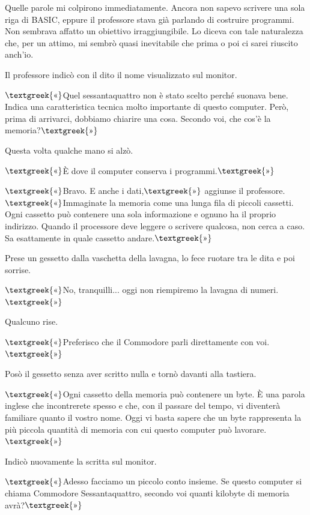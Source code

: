 \documentclass{article}
\begin{document}
Quelle parole mi colpirono immediatamente. Ancora non sapevo scrivere una sola riga di BASIC, eppure il professore stava
già parlando di costruire programmi. Non sembrava affatto un obiettivo irraggiungibile. Lo diceva con tale naturalezza
che, per un attimo, mi sembrò quasi inevitabile che prima o poi ci sarei riuscito anch'io.

Il professore indicò con il dito il nome visualizzato sul monitor.

$\text{\textgreek{«}}$Quel sessantaquattro non è stato scelto perché suonava bene. Indica una caratteristica tecnica
molto importante di questo computer. Però, prima di arrivarci, dobbiamo chiarire una cosa. Secondo voi, che cos'è la
memoria?$\text{\textgreek{»}}$

Questa volta qualche mano si alzò.

$\text{\textgreek{«}}$È dove il computer conserva i programmi.$\text{\textgreek{»}}$

$\text{\textgreek{«}}$Bravo. E anche i dati,$\text{\textgreek{»}}$ aggiunse il professore.
$\text{\textgreek{«}}$Immaginate la memoria come una lunga fila di piccoli cassetti. Ogni cassetto può contenere una
sola informazione e ognuno ha il proprio indirizzo. Quando il processore deve leggere o scrivere qualcosa, non cerca a
caso. Sa esattamente in quale cassetto andare.$\text{\textgreek{»}}$

Prese un gessetto dalla vaschetta della lavagna, lo fece ruotare tra le dita e poi sorrise.

$\text{\textgreek{«}}$No, tranquilli... oggi non riempiremo la lavagna di numeri.$\text{\textgreek{»}}$

Qualcuno rise.

$\text{\textgreek{«}}$Preferisco che il Commodore parli direttamente con voi.$\text{\textgreek{»}}$

Posò il gessetto senza aver scritto nulla e tornò davanti alla tastiera.

$\text{\textgreek{«}}$Ogni cassetto della memoria può contenere un byte. È una parola inglese che incontrerete spesso e
che, con il passare del tempo, vi diventerà familiare quanto il vostro nome. Oggi vi basta sapere che un byte
rappresenta la più piccola quantità di memoria con cui questo computer può lavorare.$\text{\textgreek{»}}$

Indicò nuovamente la scritta sul monitor.

$\text{\textgreek{«}}$Adesso facciamo un piccolo conto insieme. Se questo computer si chiama Commodore Sessantaquattro,
secondo voi quanti kilobyte di memoria avrà?$\text{\textgreek{»}}$
\end{document}
